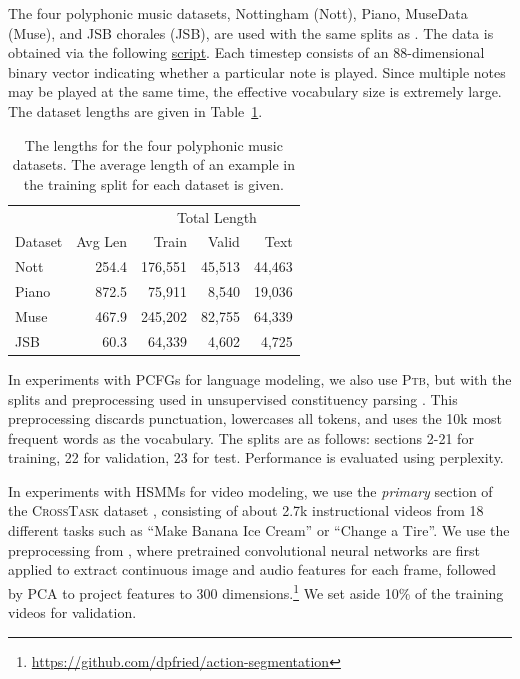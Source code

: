 \documentclass{article}
\begin{document}
The four polyphonic music datasets, Nottingham (Nott), Piano, MuseData (Muse), and JSB chorales (JSB), are used with the same splits as \citet{polyphonic}. The data is obtained via the following \href{https://github.com/pyro-ppl/pyro/blob/d7687ae0f738bd81a792dabbb18a53c0fce73765/pyro/contrib/examples/polyphonic_data_loader.py}{script}. Each timestep consists of an 88-dimensional binary vector indicating whether a particular note is played. Since multiple notes may be played at the same time, the effective vocabulary size is extremely large. The dataset lengths are given in Table~\ref{tbl:music-data}.



\begin{table}[t]
    \centering
    \begin{tabular}{lrrrr}
        \toprule
                & & \multicolumn{3}{c}{Total Length}\\
                \cmidrule{3-5}
        Dataset & Avg Len &  Train & Valid & Text \\
        \midrule
        Nott & 254.4 & 176,551 & 45,513  & 44,463 \\
        Piano& 872.5 & 75,911 & 8,540& 19,036 \\
        Muse & 467.9 &  245,202 & 82,755 & 64,339 \\
        JSB & 60.3 & 64,339 & 4,602 & 4,725\\
        \bottomrule
    \end{tabular}
    \caption{\label{tbl:music-data}The lengths for the four polyphonic music datasets. The average length of an example in the training split for each dataset is given.}
\end{table}

In experiments with PCFGs for language modeling, we also use \textsc{Ptb}, but with the splits and preprocessing used in unsupervised constituency parsing \citep{shen2018prpn,shen2018ordered,kim2019cpcfg}. This preprocessing discards punctuation, lowercases all tokens, and uses the 10k most frequent words as the vocabulary.
The splits are as follows: sections 2-21 for training, 22 for validation, 23 for test. Performance is evaluated using perplexity.

In experiments with HSMMs for video modeling, we use the \textit{primary} section of the \textsc{CrossTask} dataset \citep{zhukov2019cross}, consisting of about 2.7k instructional videos from 18 different tasks such as ``Make Banana Ice Cream'' or ``Change a Tire''. We use the preprocessing from \citet{fried2020learning}, where pretrained convolutional neural networks are first applied to extract continuous image and audio features for each frame, followed by PCA to project features to 300 dimensions.\footnote{\url{https://github.com/dpfried/action-segmentation}} We set aside 10\% of the training videos for validation.
\end{document}
